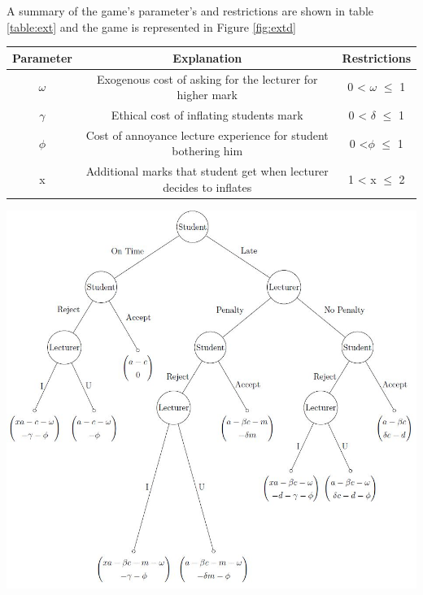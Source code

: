 \documentclass[11pt,preprint, authoryear]{elsarticle}
\let\origtable\table
\let\endorigtable\endtable
\renewenvironment{table}[1][2] {
    \expandafter\origtable\expandafter[H]
} {
    \endorigtable
}
\numberwithin{equation}{section}
\numberwithin{figure}{section}
\numberwithin{table}{section}
\begin{document}
A summary of the game's parameter's and restrictions are shown in table
\ref{table:ext} and the game is represented in Figure \ref{fig:extd}

\begin{table}
\caption{Extended Game Parameters}
\centering
\begin{tabular}{c c c} \hline
Parameter & Explanation & Restrictions \\
\hline 
\(\omega\) & Exogenous cost of asking for the lecturer for higher mark & 0 < \(\omega\) $\le$ 1 \\
\(\gamma\) & Ethical cost of inflating students mark & 0 < \(\delta\) $\le$ 1 \\
\(\phi\) & Cost of annoyance lecture experience for student bothering him & 0 <\(\phi\) $\le$ 1 \\
x & Additional marks that student get when lecturer decides to inflates &  1 < x $\le$ 2 \\ [1ex]
\hline 
\end{tabular}
\label{table:ext}
\end{table}

\includegraphics[scale=0.90]{"img/extend.jpg"}
\label{fig:extd}
\end{document}

